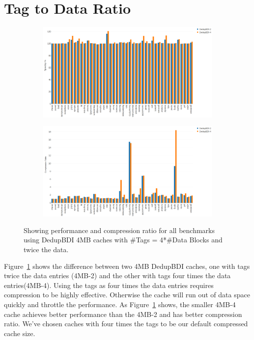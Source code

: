 \section{Tag to Data Ratio}
\label{sec:tagratio}
\begin{figure}
    \begin{subfigure}{\textwidth}
        \includegraphics[width=\textwidth]{compare-speedup.png}
    \end{subfigure}
    \begin{subfigure}{\textwidth}
        \includegraphics[width=\textwidth]{compare-compression.png}
    \end{subfigure}
    \caption[All benchmarks: Tag Ratio]{Showing performance and compression ratio for all benchmarks using DedupBDI 4MB caches with \#Tags = 4*\#Data Blocks and twice the data.}
    \label{fig:all_compare}
\end{figure}
Figure~\ref{fig:all_compare} shows the difference between two 4MB DedupBDI caches, one with tags twice the data entries (4MB-2) and the other with tags four times the data entries(4MB-4). Using the tags as four times the data entries requires compression to be highly effective. Otherwise the cache will run out of data space quickly and throttle the performance. As Figure~\ref{fig:all_compare} shows, the smaller 4MB-4 cache achieves better performance than the 4MB-2 and has better compression ratio. We've chosen caches with four times the tags to be our default compressed cache size.


